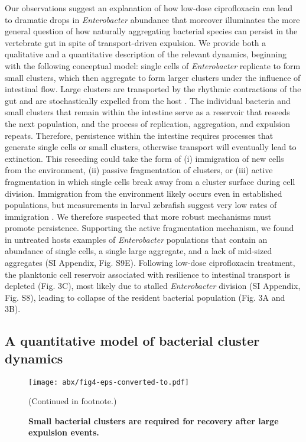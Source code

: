 Our observations suggest an explanation of how low-dose ciprofloxacin can lead to dramatic drops in \textit{Enterobacter} abundance that moreover illuminates the more general question of how naturally aggregating bacterial species can persist in the vertebrate gut in spite of transport-driven expulsion. We provide both a qualitative and a quantitative description of the relevant dynamics, beginning with the following conceptual model: single cells of \textit{Enterobacter}  replicate to form small clusters, which then aggregate to form larger clusters under the influence of intestinal flow. Large clusters are transported by the rhythmic contractions of the gut \cite{wiles_host_2016,Logan2018,ganz2018} and are stochastically expelled from the host \cite{wiles_host_2016,Logan2018}. The individual bacteria and small clusters that remain within the intestine serve as a reservoir that reseeds the next population, and the process of replication, aggregation, and expulsion repeats. Therefore, persistence  within the intestine requires processes that generate single cells or small clusters, otherwise transport will eventually lead to extinction. This reseeding could take the form of (i) immigration of new cells from the environment, (ii) passive fragmentation of  clusters, or (iii) active fragmentation in which single cells break away from a cluster surface during cell division. Immigration from the environment likely occurs even in established populations, but measurements in larval zebrafish suggest very low rates of immigration \cite{robinson_experimental_2018}. We therefore suspected that more robust mechanisms must promote persistence. Supporting the active fragmentation mechanism, we found in untreated hosts examples of \textit{Enterobacter} populations that contain an abundance of single cells, a single large aggregate, and a lack of mid-sized aggregates (SI Appendix, Fig. S9E). Following low-dose ciprofloxacin treatment, the planktonic cell reservoir associated with resilience to intestinal transport is depleted (Fig. 3C), most likely due to stalled \textit{Enterobacter} division (SI Appendix, Fig. S8), leading to collapse of the resident bacterial population (Fig. 3A and 3B).




 \subsection{A quantitative model of bacterial cluster dynamics}

\begin{figure}%
\centerline{
	\texttt{[image: abx/fig4-eps-converted-to.pdf]}}
	\caption{\textbf{Small bacterial clusters are required for recovery after large expulsion events.}}{(Continued in footnote.)}  
	\label{fig:fig4}
\end{figure}

